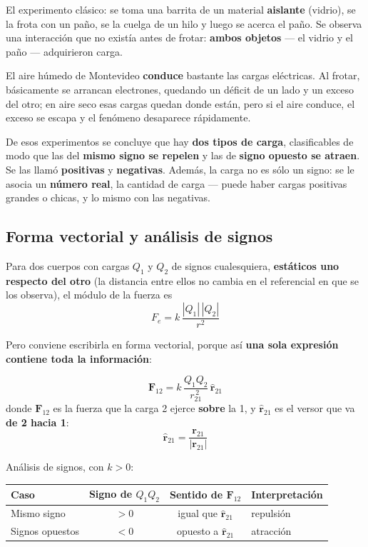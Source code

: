 \documentclass[12pt,a4paper]{article}
\begin{document}
El experimento clásico: se toma una barrita de un material \textbf{aislante}
(vidrio), se la frota con un paño, se la cuelga de un hilo y luego se acerca el
paño. Se observa una interacción que no existía antes de frotar: \textbf{ambos
objetos} --- el vidrio y el paño --- adquirieron carga.

\begin{warnbox}
El aire húmedo de Montevideo \textbf{conduce} bastante las cargas eléctricas. Al
frotar, básicamente se arrancan electrones, quedando un déficit de un lado y un
exceso del otro; en aire seco esas cargas quedan donde están, pero si el aire
conduce, el exceso se escapa y el fenómeno desaparece rápidamente.
\end{warnbox}

De esos experimentos se concluye que hay \textbf{dos tipos de carga},
clasificables de modo que las del \textbf{mismo signo se repelen} y las de
\textbf{signo opuesto se atraen}. Se las llamó \textbf{positivas} y
\textbf{negativas}. Además, la carga no es sólo un signo: se le asocia un
\textbf{número real}, la cantidad de carga --- puede haber cargas positivas
grandes o chicas, y lo mismo con las negativas.

\subsection{Forma vectorial y análisis de signos}

Para dos cuerpos con cargas $Q_1$ y $Q_2$ de signos cualesquiera, \textbf{estáticos
uno respecto del otro} (la distancia entre ellos no cambia en el referencial en
que se los observa), el módulo de la fuerza es
\[
F_e = k\,\frac{|Q_1|\,|Q_2|}{r^2}
\]

Pero conviene escribirla en forma vectorial, porque así \textbf{una sola expresión
contiene toda la información}:

\begin{keybox}
\[
\boxed{\ \mathbf{F}_{12}
      = k\,\frac{Q_1 Q_2}{r_{21}^{\,2}}\,\hat{\mathbf{r}}_{21}\ }
\]
donde $\mathbf{F}_{12}$ es la fuerza que la carga 2 ejerce \textbf{sobre} la 1, y
$\hat{\mathbf{r}}_{21}$ es el versor que va \textbf{de 2 hacia 1}:
\[
\hat{\mathbf{r}}_{21} = \frac{\mathbf{r}_{21}}{|\mathbf{r}_{21}|}
\]
\end{keybox}

Análisis de signos, con $k > 0$:

\begin{table}[H]
\centering
\begin{tabular}{lccl}
\toprule
\textbf{Caso} & \textbf{Signo de $Q_1Q_2$} & \textbf{Sentido de $\mathbf{F}_{12}$}
  & \textbf{Interpretación} \\
\midrule
Mismo signo     & $> 0$ & igual que $\hat{\mathbf{r}}_{21}$   & repulsión \\
Signos opuestos & $< 0$ & opuesto a $\hat{\mathbf{r}}_{21}$   & atracción \\
\bottomrule
\end{tabular}
\end{table}
\end{document}
